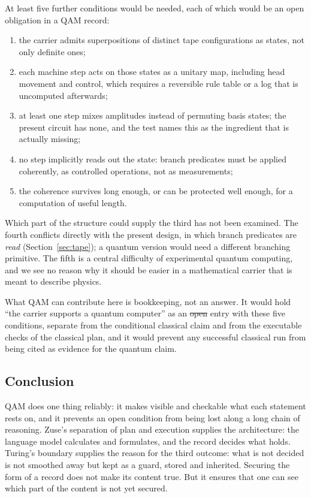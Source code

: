 At least five further conditions would be needed, each of which would be an open obligation in a QAM record:
\begin{enumerate}[label=\arabic*.,nosep,leftmargin=2em]
\item the carrier admits superpositions of distinct tape configurations as states, not only definite ones;
\item each machine step acts on those states as a unitary map, including head movement and control, which requires a reversible rule
table or a log that is uncomputed afterwards;
\item at least one step mixes amplitudes instead of permuting basis states; the present circuit has none, and the test names this as
the ingredient that is actually missing;
\item no step implicitly reads out the state: branch predicates must be applied coherently, as controlled operations, not as
measurements;
\item the coherence survives long enough, or can be protected well enough, for a computation of useful length.
\end{enumerate}
Which part of the structure could supply the third has not been examined. The fourth conflicts directly with the present design, in
which branch predicates are \emph{read} (Section~\ref{sec:tape}); a quantum version would need a different branching primitive. The
fifth is a central difficulty of experimental quantum computing, and we see no reason why it should be easier in a mathematical carrier
that is meant to describe physics.

What QAM can contribute here is bookkeeping, not an answer. It would hold ``the carrier supports a quantum computer'' as an \st{open}
entry with these five conditions, separate from the conditional classical claim and from the executable checks of the classical plan, and
it would prevent any successful classical run from being cited as evidence for the quantum claim.

\subsection{Conclusion}

QAM does one thing reliably: it makes visible and checkable what each statement rests on, and it prevents an open condition from being
lost along a long chain of reasoning. Zuse's separation of plan and execution supplies the architecture: the language model calculates and
formulates, and the record decides what holds. Turing's boundary supplies the reason for the third outcome: what is not decided is not
smoothed away but kept as a guard, stored and inherited. Securing the form of a record does not make its content true. But it ensures
that one can see which part of the content is not yet secured.
